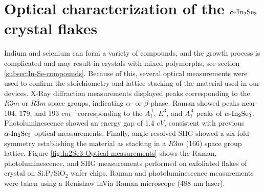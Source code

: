 \section{Optical characterization of the $\textrm{\ensuremath{\alpha}-In}_{2}\textrm{Se}_{3}$
crystal flakes}

Indium and selenium can form a variety of compounds, and the growth
process is complicated and may result in crystals with mixed polymorphs,
see section \ref{subsec:In-Se-compounds}.\citep{liu2019atomically}
Because of this, several optical measurements were used to confirm
the stoichiometry and lattice stacking of the material used in our
devices. X-Ray diffraction measurements displayed peaks corresponding
to the $R3m$ or $R\bar{3}m$ space groups, indicating $\alpha$-
or $\beta$-phase. Raman showed peaks near 104, 179, and 193 $cm^{-1}$corresponding
to the $A_{1}^{\,1}$, $E^{3}$, and $A_{1}^{\,4}$ peaks of $\textrm{\ensuremath{\alpha}-In}_{2}\textrm{Se}_{3}$.\citep{liu2019atomically,balakrishnan2018epitaxial}
Photoluminescence showed an energy gap of 1.4 $eV$, consistent with
previous $\textrm{\ensuremath{\alpha}-In}_{2}\textrm{Se}_{3}$ optical
measurements.\citep{balakrishnan2018epitaxial} Finally, angle-resolved
SHG showed a six-fold symmetry establishing the material as stacking
in a $R3m$ (166) space group lattice.\citep{hou2019resistive,dai2020intrinsic,xiao2018intrinsic}
Figure \ref{fig:In2Se3-Optical-measurements} shows the Raman, photoluminescence,
and SHG measurements performed on exfoliated flakes of crystal on
$\textrm{Si:P/Si}\textrm{O}_{2}$ wafer chips. Raman and photoluminescence
measurements were taken using a Renishaw inVia Raman microscope (488
nm laser).

